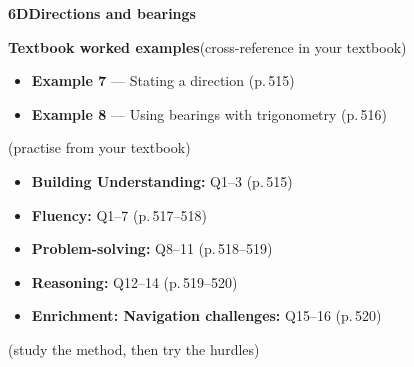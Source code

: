 \documentclass[11pt]{article}
\newcommand{\sectionband}[3]{%
  \needspace{5\baselineskip}\vspace{6pt}
  \begin{tcolorbox}[enhanced,colback=chalk,colframe=chalk,boxrule=0pt,left=12pt,right=12pt,top=8pt,bottom=8pt,arc=4pt,
      overlay={\node[anchor=east,text=white,opacity=0.9] at ([xshift=-12pt]frame.east) {\small\textsf{#3}};}]
    {\color{white}\large\bfseries\textsf{#1}\quad #2}
  \end{tcolorbox}}
\begin{document}
\sectionband{6D}{Directions and bearings}{CORE}

\begin{refbox}
{\bfseries\color{chalkdk}Textbook worked examples}\;\textcolor{inksoft}{\small(cross-reference in your textbook)}\\[3pt]
\begin{itemize}[leftmargin=16pt,itemsep=1pt,topsep=2pt]
  \item \textbf{Example 7} --- Stating a direction \textcolor{inksoft}{(p.\,515)}
  \item \textbf{Example 8} --- Using bearings with trigonometry \textcolor{inksoft}{(p.\,516)}
\end{itemize}
\;\textcolor{inksoft}{\small(practise from your textbook)}\\[3pt]
\begin{itemize}[leftmargin=16pt,itemsep=1pt,topsep=2pt]
  \item \textbf{Building Understanding:} Q1--3 \textcolor{inksoft}{(p.\,515)}
  \item \textbf{Fluency:} Q1--7 \textcolor{inksoft}{(p.\,517--518)}
  \item \textbf{Problem-solving:} Q8--11 \textcolor{inksoft}{(p.\,518--519)}
  \item \textbf{Reasoning:} Q12--14 \textcolor{inksoft}{(p.\,519--520)}
  \item \textbf{Enrichment: Navigation challenges:} Q15--16 \textcolor{inksoft}{(p.\,520)}
\end{itemize}\end{refbox}

\;\textcolor{inksoft}{\small(study the method, then try the hurdles)}\par
\end{document}
